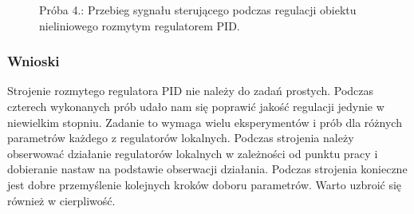 \begin{figure}[b]
    \centering
    \caption{Próba 4.: Przebieg sygnału sterującego podczas regulacji obiektu nieliniowego rozmytym regulatorem PID.}
    \label{pr_4_u}
\end{figure}

\subsubsection{Wnioski}
Strojenie rozmytego regulatora PID nie należy do zadań prostych. Podczas czterech wykonanych prób udało nam się poprawić jakość regulacji jedynie w niewielkim stopniu. Zadanie to wymaga wielu eksperymentów i prób dla różnych parametrów każdego z regulatorów lokalnych. Podczas strojenia należy obserwować działanie regulatorów lokalnych w zależności od punktu pracy i dobieranie nastaw na podstawie obserwacji działania. Podczas strojenia konieczne jest dobre przemyślenie kolejnych kroków doboru parametrów. Warto uzbroić się również w cierpliwość.
